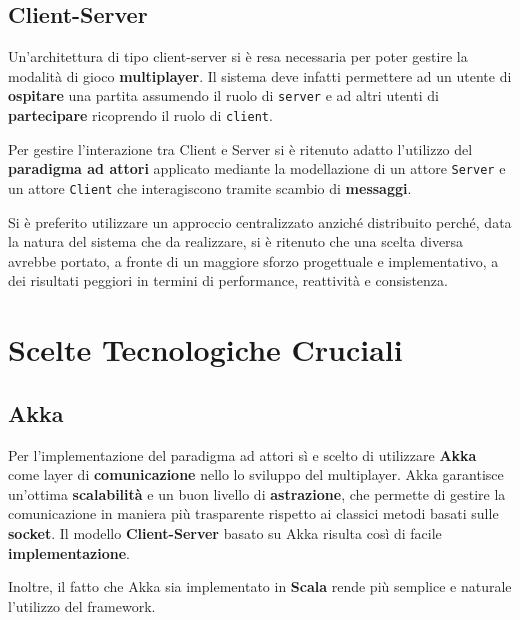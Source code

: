 \subsection{Client-Server} 
Un'architettura di tipo client-server si è resa necessaria per poter gestire la modalità di gioco \textbf{multiplayer}. Il sistema deve infatti permettere ad un utente di \textbf{ospitare} una partita assumendo il ruolo di \texttt{server} e ad altri utenti di \textbf{partecipare} ricoprendo il ruolo di \texttt{client}. 

Per gestire l'interazione tra Client e Server si è ritenuto adatto l'utilizzo del \textbf{paradigma ad attori} applicato mediante la modellazione di un attore \texttt{Server} e un attore \texttt{Client} che interagiscono tramite scambio di \textbf{messaggi}. 

Si è preferito utilizzare un approccio centralizzato anziché distribuito perché, data la natura del sistema che da realizzare, si è ritenuto che una scelta diversa avrebbe portato, a fronte di un maggiore sforzo progettuale e implementativo, a dei risultati peggiori in termini di performance, reattività e consistenza.

\section{Scelte Tecnologiche Cruciali}
    \subsection{Akka} 
        Per l'implementazione del paradigma ad attori sì e scelto di utilizzare \textbf{Akka} come layer di \textbf{comunicazione} nello lo sviluppo del multiplayer. Akka garantisce un'ottima \textbf{scalabilità} e un buon livello di \textbf{astrazione}, che permette di gestire la comunicazione in maniera più trasparente rispetto ai classici metodi basati sulle \textbf{socket}. Il modello \textbf{Client-Server} basato su Akka risulta così di facile \textbf{implementazione}.
        
        Inoltre, il fatto che Akka sia implementato in \textbf{Scala} rende più semplice e naturale l'utilizzo del framework. 